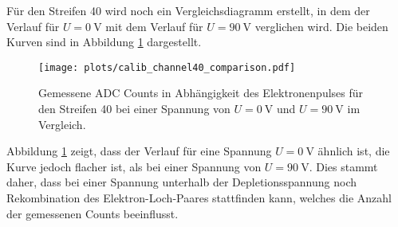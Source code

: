 
Für den Streifen 40 wird noch ein Vergleichsdiagramm erstellt, in dem der Verlauf 
für $U = \SI{0}{\volt}$ mit dem Verlauf für $U = \SI{90}{\volt}$ 
verglichen wird. Die beiden Kurven sind in Abbildung \ref{fig:kalibvergleich} 
dargestellt.

\begin{figure}[H]
  \centering
  \texttt{[image: plots/calib\_channel40\_comparison.pdf]}
  \caption{Gemessene ADC Counts in Abhängigkeit des Elektronenpulses für den Streifen 40 bei einer 
    Spannung von $U = \SI{0}{\volt}$ und $U = \SI{90}{\volt}$ im Vergleich.}
  \label{fig:kalibvergleich}
\end{figure}

Abbildung \ref{fig:kalibvergleich} zeigt, dass der Verlauf für eine Spannung 
$U = \SI{0}{\volt}$ ähnlich ist, die Kurve jedoch flacher ist, als bei einer Spannung 
von $U = \SI{90}{\volt}$. Dies stammt daher, dass bei einer Spannung unterhalb der 
Depletionsspannung noch Rekombination des Elektron-Loch-Paares stattfinden kann, 
welches die Anzahl der gemessenen Counts beeinflusst. \par 

